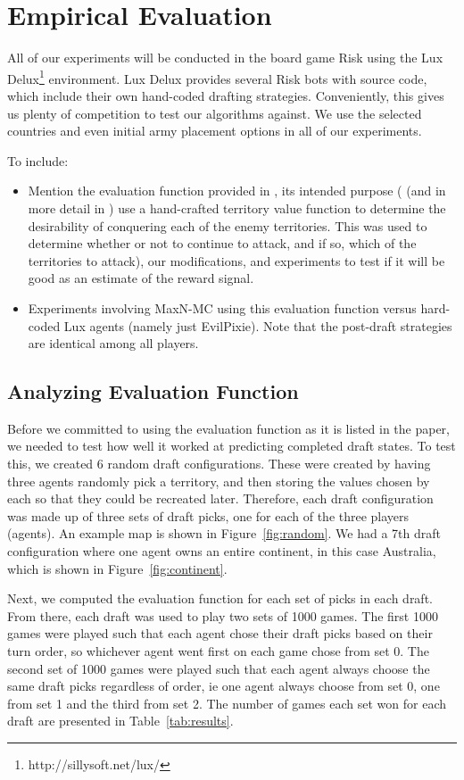 \documentclass[letterpaper]{article}
\numberwithin{equation}{section}
\numberwithin{theorem}{section}
\numberwithin{lemma}{section}
\numberwithin{df}{section}
\begin{document}
\section{Empirical Evaluation}

All of our experiments will be conducted in the board game Risk using the Lux Delux\footnote{http://sillysoft.net/lux/} environment.  Lux Delux provides several Risk bots with source code, which include their own hand-coded drafting strategies.  Conveniently, this gives us plenty of competition to test our algorithms against.  We use the selected countries and even initial army placement options in all of our experiments.

To include:
\begin{itemize}
	\item Mention the evaluation function provided in \cite{RiskBots}, its intended purpose (\cite{RiskBots} (and in more detail in \cite{Ols2005}) use a hand-crafted territory value function to determine the desirability of conquering each of the enemy territories.  This was used to determine whether or not to continue to attack, and if so, which of the territories to attack), our modifications, and experiments to test if it will be good as an estimate of the reward signal.
	\item Experiments involving MaxN-MC using this evaluation function versus hard-coded Lux agents (namely just EvilPixie).  Note that the post-draft strategies are identical among all players.
\end{itemize}

\subsection{Analyzing Evaluation Function}

Before we committed to using the evaluation function as it is listed in the paper, we needed to test how well it worked at predicting completed draft states. To test this, we created 6 random draft configurations. These were created by having three agents randomly pick a territory, and then storing the values chosen by each so that they could be recreated later. Therefore, each draft configuration was made up of three sets of draft picks, one for each of the three players (agents). An example map is shown in Figure~\ref{fig:random}. We had a 7th draft configuration where one agent owns an entire continent, in this case Australia, which is shown in Figure~\ref{fig:continent}. 

Next, we computed the evaluation function for each set of picks in each draft. From there, each draft was used to play two sets of 1000 games. The first 1000 games were played such that each agent chose their draft picks based on their turn order, so whichever agent went first on each game chose from set 0. The second set of 1000 games were played such that each agent always choose the same draft picks regardless of order, ie one agent always choose from set 0, one from set 1 and the third from set 2. The number of games each set won for each draft are presented in Table~\ref{tab:results}.
\end{document}
